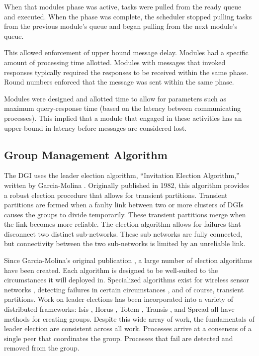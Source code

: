 When that modules phase was active, tasks were pulled from the ready queue and executed.
When the phase was complete, the scheduler stopped pulling tasks from the previous module's queue and began pulling from the next module's queue.

This allowed enforcement of upper bound message delay.
Modules had a specific amount of processing time allotted.
Modules with messages that invoked responses typically required the responses to be received within the same phase.
Round numbers enforced that the message was sent within the same phase.

Modules were designed and allotted time to allow for parameters such as maximum query-response time (based on the latency between communicating processes).
This implied that a module that engaged in these activities has an upper-bound in latency before messages are considered lost.

\subsection{Group Management Algorithm}

The DGI uses the leader election algorithm, ``Invitation Election Algorithm,'' written by Garcia-Molina \cite{INVITATIONELECTION}.
Originally published in 1982, this algorithm provides a robust election  procedure that allows for transient partitions.
Transient partitions are formed when a faulty link between two or more clusters of DGIs causes the groups to divide temporarily.
These transient partitions merge when the link becomes more reliable.
The election algorithm allows for failures that disconnect two distinct sub-networks.
These sub networks are fully connected, but connectivity between the two sub-networks is limited by an unreliable link.

Since Garcia-Molina's original publication \cite{INVITATIONELECTION}, a large number of election algorithms have been created. 
Each algorithm is designed to be well-suited to the circumstances it will deployed in.
Specialized algorithms exist for wireless sensor networks \cite{LE-WSN-1}\cite{LE-WSN-2}, detecting failures in certain circumstances \cite{LE-SPECIALCIRCUMSTANCES-1}\cite{LE-SPECIALCIRCUMSTANCES-2}, and of course, transient partitions.
Work on leader elections has been incorporated into a variety of distributed frameworks: Isis \cite{ISISTOOLKIT}, Horus \cite{HORUSTOOLKIT}, Totem \cite{TOTEMTOOLKIT}, Transis \cite{TRANSISTOOLKIT}, and Spread \cite{SPREADTOOLKIT} all have methods for creating groups.
Despite this wide array of work, the fundamentals of leader election are consistent
across all work.
Processes arrive at a consensus of a single peer that coordinates the group.
Processes that fail are detected and removed from the group. 

